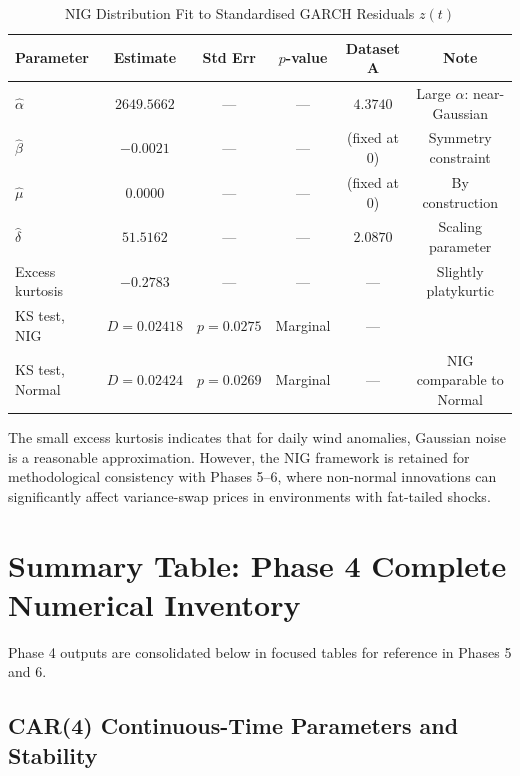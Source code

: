 \documentclass[11pt, a4paper, twoside]{article}
\begin{document}
\begin{table}[ht]
\centering
\caption{NIG Distribution Fit to Standardised GARCH Residuals $z(t)$}
\label{tbl:nig_fit}
\small
\begin{tabularx}{\textwidth}{l|ccc|cc}
\toprule
\textbf{Parameter} & \textbf{Estimate} & \textbf{Std Err} & \textbf{$p$-value} & \textbf{Dataset A} & \textbf{Note} \\
\midrule
$\hat{\alpha}$ & $2649.5662$ & — & — & $4.3740$ & Large $\alpha$: near-Gaussian \\
$\hat{\beta}$ & $-0.0021$ & — & — & (fixed at 0) & Symmetry constraint \\
$\hat{\mu}$ & $0.0000$ & — & — & (fixed at 0) & By construction \\
$\hat{\delta}$ & $51.5162$ & — & — & $2.0870$ & Scaling parameter \\
\midrule
Excess kurtosis & $-0.2783$ & — & — & — & Slightly platykurtic \\
KS test, NIG & $D = 0.02418$ & $p = 0.0275$ & Marginal & — & \\
KS test, Normal & $D = 0.02424$ & $p = 0.0269$ & Marginal & — & NIG comparable to Normal \\
\bottomrule
\end{tabularx}
\end{table}

The small excess kurtosis indicates that for daily wind anomalies, Gaussian noise is a reasonable approximation. However, the NIG framework is retained for methodological consistency with Phases 5--6, where non-normal innovations can significantly affect variance-swap prices in environments with fat-tailed shocks.

\section{Summary Table: Phase 4 Complete Numerical Inventory}

Phase 4 outputs are consolidated below in focused tables for reference in Phases 5 and 6.

\subsection*{CAR(4) Continuous-Time Parameters and Stability}
\end{document}
